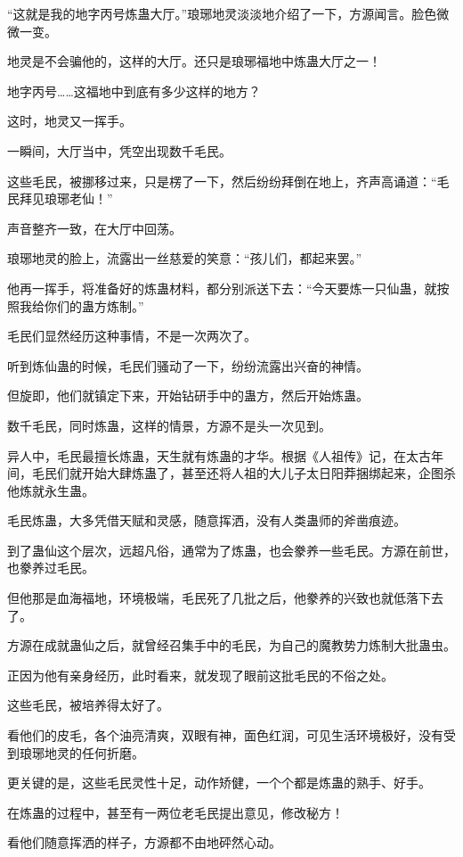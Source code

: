 \begin{this_body}
“这就是我的地字丙号炼蛊大厅。”琅琊地灵淡淡地介绍了一下，方源闻言。脸色微微一变。

地灵是不会骗他的，这样的大厅。还只是琅琊福地中炼蛊大厅之一！

地字丙号……这福地中到底有多少这样的地方？

这时，地灵又一挥手。

一瞬间，大厅当中，凭空出现数千毛民。

这些毛民，被挪移过来，只是楞了一下，然后纷纷拜倒在地上，齐声高诵道：“毛民拜见琅琊老仙！”

声音整齐一致，在大厅中回荡。

琅琊地灵的脸上，流露出一丝慈爱的笑意：“孩儿们，都起来罢。”

他再一挥手，将准备好的炼蛊材料，都分别派送下去：“今天要炼一只仙蛊，就按照我给你们的蛊方炼制。”

毛民们显然经历这种事情，不是一次两次了。

听到炼仙蛊的时候，毛民们骚动了一下，纷纷流露出兴奋的神情。

但旋即，他们就镇定下来，开始钻研手中的蛊方，然后开始炼蛊。

数千毛民，同时炼蛊，这样的情景，方源不是头一次见到。

异人中，毛民最擅长炼蛊，天生就有炼蛊的才华。根据《人祖传》记，在太古年间，毛民们就开始大肆炼蛊了，甚至还将人祖的大儿子太日阳莽捆绑起来，企图杀他炼就永生蛊。

毛民炼蛊，大多凭借天赋和灵感，随意挥洒，没有人类蛊师的斧凿痕迹。

到了蛊仙这个层次，远超凡俗，通常为了炼蛊，也会豢养一些毛民。方源在前世，也豢养过毛民。

但他那是血海福地，环境极端，毛民死了几批之后，他豢养的兴致也就低落下去了。

方源在成就蛊仙之后，就曾经召集手中的毛民，为自己的魔教势力炼制大批蛊虫。

正因为他有亲身经历，此时看来，就发现了眼前这批毛民的不俗之处。

这些毛民，被培养得太好了。

看他们的皮毛，各个油亮清爽，双眼有神，面色红润，可见生活环境极好，没有受到琅琊地灵的任何折磨。

更关键的是，这些毛民灵性十足，动作矫健，一个个都是炼蛊的熟手、好手。

在炼蛊的过程中，甚至有一两位老毛民提出意见，修改秘方！

看他们随意挥洒的样子，方源都不由地砰然心动。


\end{this_body}
